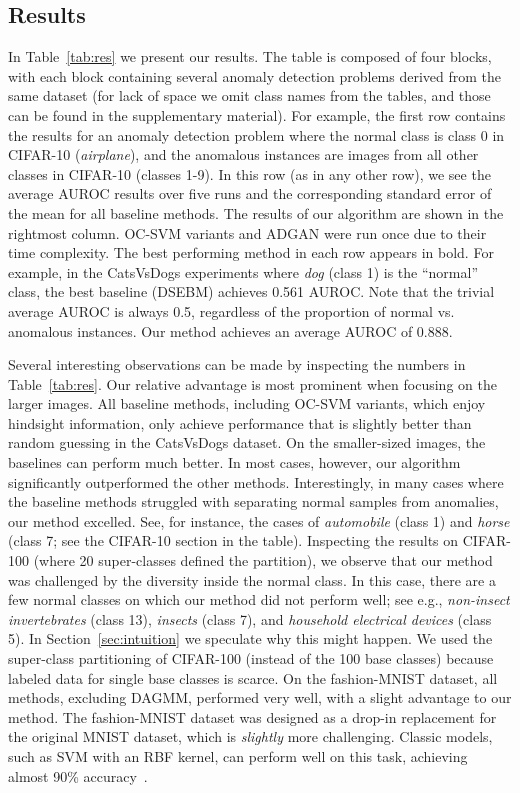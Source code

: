 \documentclass{article}
\begin{document}
	\subsection{Results}
    In Table~\ref{tab:res} we present our results. The table is composed of four blocks, with each block containing several anomaly detection problems derived from the same dataset (for lack of space we omit class names from the
    tables, and those can be found in the supplementary material).
    For example, the first row contains the results for an anomaly detection problem where the normal class is class 0 in CIFAR-10 ({\em airplane}), and the anomalous instances are images from all other classes in CIFAR-10 (classes 1-9). 
    In this row (as in any other row), we see the average AUROC results over five runs and the corresponding standard error of the mean for all baseline methods. The results of our algorithm are shown in the rightmost column. OC-SVM variants and ADGAN were run once due to their time complexity. The best performing method in each row appears in bold. For example, in the CatsVsDogs experiments where {\em dog} (class 1) 
    is the ``normal'' class, the best baseline (DSEBM) achieves 0.561 AUROC. 
    Note that the trivial average AUROC is always 0.5, regardless of the proportion of normal vs. anomalous instances. Our method achieves an average AUROC of 0.888.
   
	
	Several interesting observations can be made by inspecting the numbers in Table~\ref{tab:res}. Our relative advantage is most prominent when focusing on the larger images. All baseline methods, including OC-SVM variants, which enjoy hindsight information, only achieve performance that is slightly better than random guessing in the CatsVsDogs dataset. On the smaller-sized images, the baselines can perform much better. In most cases, however, our algorithm significantly outperformed the other methods. Interestingly, in many cases where the baseline methods struggled with separating normal samples from anomalies, our method excelled. See, for instance, the cases of {\em automobile} (class 1) and {\em horse} (class 7; see the CIFAR-10 section in the table). 
	Inspecting the results on CIFAR-100 (where 20 super-classes defined the partition), we observe that our method was challenged by the diversity inside the normal class. In this case, there are a few normal classes on which our method did not perform well; see e.g., 
	\emph{non-insect invertebrates} (class 13), \emph{insects} (class 7), and \emph{household electrical devices} (class 5). In Section~\ref{sec:intuition} we speculate why this might happen. 
	We used the super-class partitioning of CIFAR-100 (instead of the 100 base classes) because labeled data for single base classes is scarce. 
	On the fashion-MNIST dataset, all methods, excluding DAGMM, performed very well, with a slight advantage to our method. The fashion-MNIST dataset was designed as a drop-in replacement for the original MNIST dataset, which is {\em slightly} more challenging. Classic models, such as SVM with an RBF kernel, can perform well on this 
task, achieving almost 90\% accuracy~\cite{Xiao2017FashionMNISTAN}.
	
\end{document}
